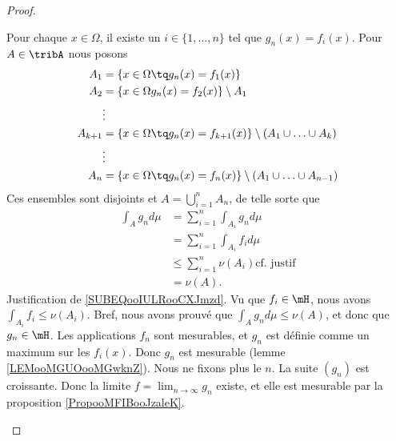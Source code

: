\begin{proof}
\begin{subproof}
												\spitem[\( g_n\in \mH\)]

												Pour chaque \( x\in\Omega\), il existe un \( i\in\{ 1,\ldots,n \}\) tel que \( g_n(x)=f_i(x)\). Pour \( A\in \tribA\) nous posons
												\begin{subequations}
												\begin{align}
												A_1     & =\{ x\in\Omega\tq g_n(x)=f_1(x) \}                                       \\
																	 A_2     & =\{ x\in\Omega g_n(x)=f_2(x) \}\setminus A_1                             \\
																	 & \vdots                                                                   \\
																	 A_{k+1} & =\{ x\in\Omega\tq g_n(x)=f_{k+1}(x) \}\setminus (A_1\cup\ldots \cup A_k) \\
																	 & \vdots                                                                   \\
																	 A_n     & =\{ x\in\Omega\tq g_n(x)=f_n(x) \}\setminus (A_1\cup\ldots \cup A_{n-1})
																	 \end{align}
																	 \end{subequations}
																	 Ces ensembles sont disjoints et \( A=\bigcup_{i=1}^nA_n\), de telle sorte que
																	 \begin{subequations}
																	 \begin{align}
																	 \int_Ag_nd\mu & =\sum_{i=1}^n\int_{A_i}g_nd\mu                                           \\
																										& =\sum_{i=1}^n\int_{A_i}f_id\mu                                           \\
																										& \leq \sum_{i=1}^n\nu(A_i)   \text{cf. justif}		\label{SUBEQooIULRooCXJmzd} \\
																										& =\nu(A).
																										\end{align}
																										\end{subequations}
																										Justification de \eqref{SUBEQooIULRooCXJmzd}. Vu que \( f_i\in \mH\), nous avons \( \int_{A_i}f_i\leq \nu(A_i)\). Bref, nous avons prouvé que \( \int_Ag_nd\mu\leq \nu(A)\), et donc que \( g_n\in \mH\).
																										Les applications \( f_n\) sont mesurables, et \( g_n\) est définie comme un maximum sur les \( f_i(x)\). Donc \( g_n\) est mesurable (lemme \ref{LEMooMGUOooMGwknZ}).
																										Nous ne fixons plus le \( n\). La suite \( (g_n)\) est croissante. Donc la limite \( f=\lim_{n\to\infty}g_n\) existe, et elle est mesurable par la proposition \ref{PropooMFIBooJzaleK}.


\end{subproof}
\end{proof}
